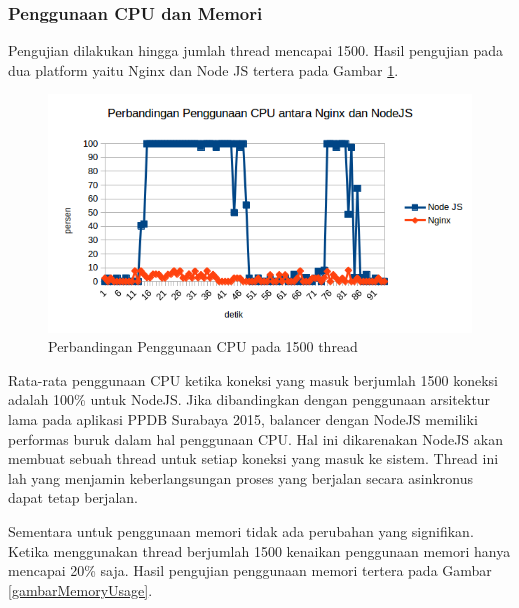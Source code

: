 \documentclass{ta-its}
\begin{document}
				\subsubsection{Penggunaan CPU dan Memori}
					Pengujian dilakukan hingga jumlah thread mencapai 1500. Hasil pengujian pada dua platform yaitu Nginx dan Node JS tertera pada Gambar \ref{gambarUsage1500}.
					
					\begin{figure}[h] %
						\centering
						\includegraphics[width=\linewidth]{contoh_img/perbandingan-cpu}
						\caption{Perbandingan Penggunaan CPU pada 1500 thread}
						\label{gambarUsage1500}
					\end{figure}
					
					Rata-rata penggunaan CPU ketika koneksi yang masuk berjumlah 1500 koneksi adalah 100\% untuk NodeJS. Jika dibandingkan dengan penggunaan arsitektur lama pada aplikasi PPDB Surabaya 2015, balancer dengan NodeJS memiliki performas buruk dalam hal penggunaan CPU. Hal ini dikarenakan NodeJS akan membuat sebuah thread untuk setiap koneksi yang masuk ke sistem. Thread ini lah yang menjamin keberlangsungan proses yang berjalan secara asinkronus dapat tetap berjalan.
					
					Sementara untuk penggunaan memori tidak ada perubahan yang signifikan. Ketika menggunakan thread berjumlah 1500 kenaikan penggunaan memori hanya mencapai 20\% saja. Hasil pengujian penggunaan memori tertera pada Gambar \ref{gambarMemoryUsage}.
					
\end{document}
